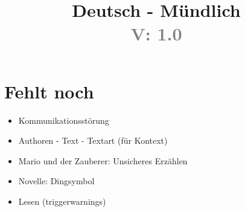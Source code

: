 \documentclass{article}
\title{Deutsch - Mündlich \\ \textcolor{gray}{\small V: 1.0}}
\date{ }
\author{ }
\begin{document}
    \maketitle
    \tableofcontents

    \newpage

    

    \section{Fehlt noch}
    \begin{itemize}
        \item Kommunikationsstörung
        \item Authoren - Text - Textart (für Kontext)
        \item Mario und der Zauberer: Unsicheres Erzählen
        \item Novelle: Dingsymbol
        \item Lesen (triggerwarnings)
    \end{itemize}
\end{document}
